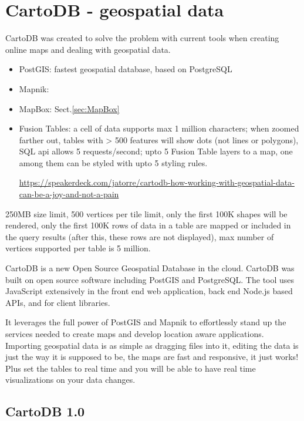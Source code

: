 \chapter{CartoDB - geospatial data}
\label{chap:CartoDB}

CartoDB was created to solve the problem with current tools when creating online
maps and dealing with geospatial data.
\begin{itemize}
  \item PostGIS: fastest geospatial database, based on PostgreSQL
  
  \item Mapnik:  

  \item MapBox: Sect.\ref{sec:MapBox}
    
  \item Fusion Tables: a  cell of data supports max 1 million characters; when
  zoomed farther out, tables with > 500 features will show dots (not lines or
  polygons), SQL api allows 5 requests/second; upto 5 Fusion Table layers to a
  map, one among them can be styled with upto 5 styling rules.
  
  \url{https://speakerdeck.com/jatorre/cartodb-how-working-with-geospatial-data-can-be-a-joy-and-not-a-pain}
\end{itemize}
250MB size limit, 500 vertices per tile limit, only the
  first 100K shapes will be rendered, only the first 100K rows of data in a
  table are mapped or included in the query results (after this, these rows are
  not displayed), max number of vertices supported per table is 5 million.
  

CartoDB is a new Open Source Geospatial Database in the cloud. 
CartoDB was built on open source software including PostGIS and PostgreSQL. The
tool uses JavaScript extensively in the front end web application, back end
Node.js based APIs, and for client libraries. 

It leverages the full power of PostGIS and Mapnik to effortlessly stand up the
services needed to create maps and develop location aware applications.
Importing geospatial data is as simple as dragging files into it, editing the
data is just the way it is supposed to be, the maps are fast and responsive, it
just works! Plus set the tables to real time and you will be able to have real
time visualizations on your data changes.



\section{CartoDB 1.0}

